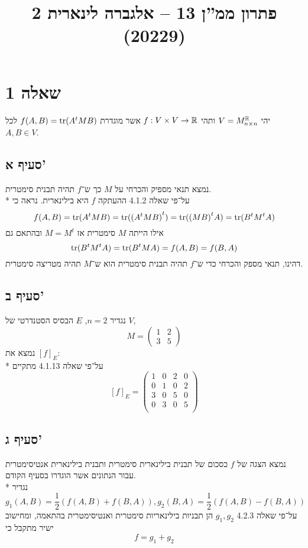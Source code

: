 
\title{פתרון ממ''ן 13 – אלגברה לינארית 2 (20229)}


\maketitle

\section{שאלה 1}
יהי $V = M_{n \times n}^{\mathbb{R}}$ ותהי $f: V \times V \to \mathbb{R}$ אשר מוגדרת $f(A, B) = \operatorname{tr}(A^t M B)$ לכל $A, B \in V$.

\subsection{סעיף א'}
נמצא תנאי מספיק והכרחי על $M$ כך ש־$f$ תהיה תבנית סימטרית. \\*
על־פי שאלה 4.1.2 ההעתקה $f$ היא בילינארית. נראה כי
\[
	f(A, B) = \operatorname{tr}(A^t M B) = \operatorname{tr}( {(A^t M B)}^t ) = \operatorname{tr}( {(M B)}^t A) = \operatorname{tr}( B^t M^t A)
\]
אילו הייתה $M$ סימטרית אז $M = M^t$ ובהתאם גם
\[
	\operatorname{tr}(B^t M^t A) = \operatorname{tr}( B^t M A) = f(A, B) = f(B, A)
\]
דהינו, תנאי מספק והכרחי כדי ש־$f$ תהיה תבנית סימטרית הוא ש־$M$ תהיה מטריצה סימטרית.

\subsection{סעיף ב'}
נגדיר $n = 2$, $E$ הבסיס הסטנדרטי של $V$,
\[
	M = \begin{pmatrix}
		1 & 2 \\
		3 & 5
	\end{pmatrix}
\]
נמצא את ${[f]}_E$: \\*
על־פי שאלה 4.1.13 מתקיים
\[
	{[f]}_E = \begin{pmatrix}
		1 & 0 & 2 & 0 \\
		0 & 1 & 0 & 2 \\
		3 & 0 & 5 & 0 \\
		0 & 3 & 0 & 5 \\
	\end{pmatrix}
\]

\subsection{סעיף ג'}
נמצא הצגה של $f$ כסכום של תבנית בילינארית סימטרית ותבנית בילינארית אנטיסימטרית עבור הנתונים אשר הוגדרו בסעיף הקודם. \\*
נגדיר
\[
	g_1(A, B) = \frac{1}{2} (f(A, B) + f(B, A)), g_2(B, A) = \frac{1}{2}(f(A, B) - f(B, A))
\]
על־פי שאלה 4.2.3 $g_1, g_2$ הן תבניות בילינאריות סימטרית ואנטיסימטרית בהתאמה, ומחישוב ישיר מתקבל כי
\[
	f = g_1 + g_2
\]

